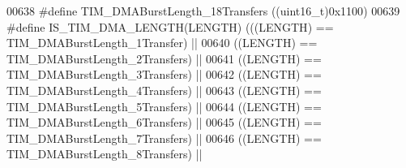 \begin{DoxyCode}
00638 \textcolor{preprocessor}{#}\textcolor{preprocessor}{define} \textcolor{preprocessor}{TIM\_DMABurstLength\_18Transfers}         \textcolor{preprocessor}{(}\textcolor{preprocessor}{(}\textcolor{preprocessor}{uint16\_t}\textcolor{preprocessor}{)}0x1100\textcolor{preprocessor}{)}
00639 \textcolor{preprocessor}{#}\textcolor{preprocessor}{define} \textcolor{preprocessor}{IS\_TIM\_DMA\_LENGTH}\textcolor{preprocessor}{(}\textcolor{preprocessor}{LENGTH}\textcolor{preprocessor}{)} \textcolor{preprocessor}{(}\textcolor{preprocessor}{(}\textcolor{preprocessor}{(}\textcolor{preprocessor}{LENGTH}\textcolor{preprocessor}{)} \textcolor{preprocessor}{==} 
      TIM_DMABurstLength_1Transfer\textcolor{preprocessor}{)} \textcolor{preprocessor}{||}
00640                                    \textcolor{preprocessor}{(}\textcolor{preprocessor}{(}\textcolor{preprocessor}{LENGTH}\textcolor{preprocessor}{)} \textcolor{preprocessor}{==} 
      TIM_DMABurstLength_2Transfers\textcolor{preprocessor}{)} \textcolor{preprocessor}{||}
00641                                    \textcolor{preprocessor}{(}\textcolor{preprocessor}{(}\textcolor{preprocessor}{LENGTH}\textcolor{preprocessor}{)} \textcolor{preprocessor}{==} 
      TIM_DMABurstLength_3Transfers\textcolor{preprocessor}{)} \textcolor{preprocessor}{||}
00642                                    \textcolor{preprocessor}{(}\textcolor{preprocessor}{(}\textcolor{preprocessor}{LENGTH}\textcolor{preprocessor}{)} \textcolor{preprocessor}{==} 
      TIM_DMABurstLength_4Transfers\textcolor{preprocessor}{)} \textcolor{preprocessor}{||}
00643                                    \textcolor{preprocessor}{(}\textcolor{preprocessor}{(}\textcolor{preprocessor}{LENGTH}\textcolor{preprocessor}{)} \textcolor{preprocessor}{==} 
      TIM_DMABurstLength_5Transfers\textcolor{preprocessor}{)} \textcolor{preprocessor}{||}
00644                                    \textcolor{preprocessor}{(}\textcolor{preprocessor}{(}\textcolor{preprocessor}{LENGTH}\textcolor{preprocessor}{)} \textcolor{preprocessor}{==} 
      TIM_DMABurstLength_6Transfers\textcolor{preprocessor}{)} \textcolor{preprocessor}{||}
00645                                    \textcolor{preprocessor}{(}\textcolor{preprocessor}{(}\textcolor{preprocessor}{LENGTH}\textcolor{preprocessor}{)} \textcolor{preprocessor}{==} 
      TIM_DMABurstLength_7Transfers\textcolor{preprocessor}{)} \textcolor{preprocessor}{||}
00646                                    \textcolor{preprocessor}{(}\textcolor{preprocessor}{(}\textcolor{preprocessor}{LENGTH}\textcolor{preprocessor}{)} \textcolor{preprocessor}{==} 
      TIM_DMABurstLength_8Transfers\textcolor{preprocessor}{)} \textcolor{preprocessor}{||}

\end{DoxyCode}
